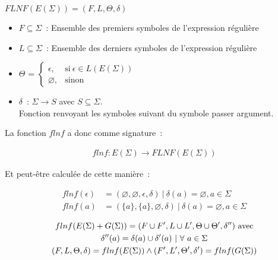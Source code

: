 \documentclass[12pt]{article}
\begin{document}
\begin{center}
    \(FLNF(E(\Sigma)) = (F, L, \Theta, \delta)\)

    \begin{itemize}
        \item[\textbullet] \(F \subseteq \Sigma\)~: Ensemble des premiers
            symboles de l'expression régulière

            \vphantom{}

        \item[\textbullet] \(L \subseteq \Sigma\)~: Ensemble des derniers
            symboles de l'expression régulière

            \vphantom{}

        \item[\textbullet] \(\Theta\) =
            \(
            \begin{cases}
                \epsilon,    & \text{si}~ \epsilon \in L(E(\Sigma)) \\
                \varnothing, & \text{sinon}
            \end{cases}
            \)

            \vphantom{}

        \item[\textbullet] \(\delta\)~: \(\Sigma \to S\) avec \(S \subseteq
            \Sigma\). \\
            Fonction renvoyant les symboles suivant du symbole passer argument.
    \end{itemize}
\end{center}

La fonction \(flnf\) a donc comme signature~:

\begin{align}
    flnf: E(\Sigma) \to FLNF(E(\Sigma))
\end{align}

Et peut-être calculée de cette manière~:

\begin{align}
    flnf(\epsilon) & = (\varnothing, \varnothing, \epsilon, \delta) ~|~ \delta(a) = \varnothing, a \in \Sigma \\
    flnf(a)        & = (\{a\}, \{a\}, \varnothing, \delta) ~|~ \delta(a) = \varnothing, a
    \in \Sigma
\end{align}

\begin{gather}
    flnf(E(\Sigma) + G(\Sigma)) = (F \cup F', L \cup L', \Theta \cup \Theta', \delta'')~ \text{avec} \\
    \delta''(a) = \delta(a) \cup \delta'(a) ~|~ \forall~a \in \Sigma \notag \\
    (F, L, \Theta, \delta) = flnf(E(\Sigma)) \land (F', L', \Theta', \delta') = flnf(G(\Sigma)) \notag
\end{gather}
\end{document}
